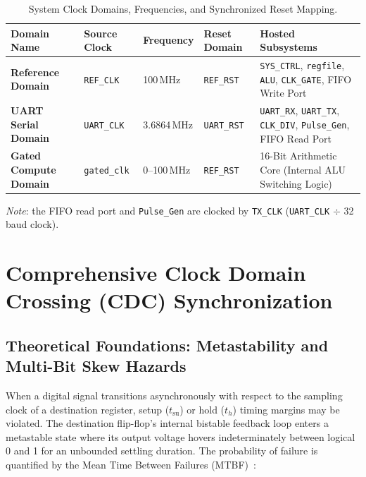 \documentclass[11pt,a4paper]{article}
\begin{document}
\begin{table}[H]
\centering
\caption{System Clock Domains, Frequencies, and Synchronized Reset Mapping.}
\label{tab:clock_domains}
\renewcommand{\arraystretch}{1.3}
\begin{tabularx}{\textwidth}{|Y|Y|Y|Y|Y|}
\hline
\textbf{Domain Name} & \textbf{Source Clock} & \textbf{Frequency} & \textbf{Reset Domain} & \textbf{Hosted Subsystems} \\
\hline
\textbf{Reference Domain} & \texttt{REF\_CLK} & 100\,MHz & \texttt{REF\_RST} & \texttt{SYS\_CTRL}, \texttt{regfile}, \texttt{ALU}, \texttt{CLK\_GATE}, FIFO Write Port \\
\hline
\textbf{UART Serial Domain} & \texttt{UART\_CLK} & 3.6864\,MHz & \texttt{UART\_RST} & \texttt{UART\_RX}, \texttt{UART\_TX}, \texttt{CLK\_DIV}, \texttt{Pulse\_}\allowbreak\texttt{Gen}, FIFO Read Port \\
\hline
\textbf{Gated Compute Domain} & \texttt{gated\_clk} & 0--100\,MHz & \texttt{REF\_RST} & 16-Bit Arithmetic Core (Internal ALU Switching Logic) \\
\hline
\end{tabularx}
\vspace{2pt}
{\footnotesize\textit{Note}: the FIFO read port and \texttt{Pulse\_Gen} are clocked by \texttt{TX\_CLK} (\texttt{UART\_CLK} $\div$ 32 baud clock).}
\end{table}

\section{Comprehensive Clock Domain Crossing (CDC) Synchronization}

\subsection{Theoretical Foundations: Metastability and Multi-Bit Skew Hazards}
When a digital signal transitions asynchronously with respect to the sampling clock of a destination register, setup ($t_{\text{su}}$) or hold ($t_h$) timing margins may be violated. The destination flip-flop's internal bistable feedback loop enters a metastable state where its output voltage hovers indeterminately between logical 0 and 1 for an unbounded settling duration. The probability of failure is quantified by the Mean Time Between Failures (MTBF)~\cite{cummings_cdc}:
\end{document}
